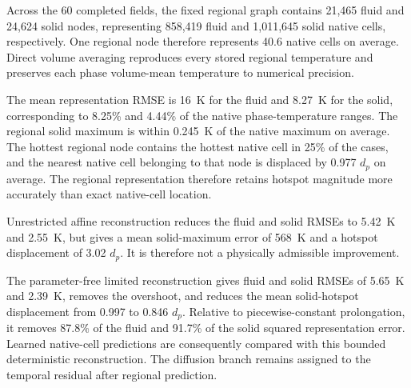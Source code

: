 Across the 60 completed fields, the fixed regional graph contains 21,465 fluid and 24,624 solid nodes, representing 858,419 fluid and 1,011,645 solid native cells, respectively. One regional node therefore represents 40.6 native cells on average. Direct volume averaging reproduces every stored regional temperature and preserves each phase volume-mean temperature to numerical precision.

The mean representation RMSE is \SI{16}{K} for the fluid and \SI{8.27}{K} for the solid, corresponding to 8.25\% and 4.44\% of the native phase-temperature ranges. The regional solid maximum is within \SI{0.245}{K} of the native maximum on average. The hottest regional node contains the hottest native cell in 25\% of the cases, and the nearest native cell belonging to that node is displaced by 0.977 $d_p$ on average. The regional representation therefore retains hotspot magnitude more accurately than exact native-cell location.

Unrestricted affine reconstruction reduces the fluid and solid RMSEs to \SI{5.42}{K} and \SI{2.55}{K}, but gives a mean solid-maximum error of \SI{568}{K} and a hotspot displacement of 3.02 $d_p$. It is therefore not a physically admissible improvement.

The parameter-free limited reconstruction gives fluid and solid RMSEs of \SI{5.65}{K} and \SI{2.39}{K}, removes the overshoot, and reduces the mean solid-hotspot displacement from 0.997 to 0.846 $d_p$. Relative to piecewise-constant prolongation, it removes 87.8\% of the fluid and 91.7\% of the solid squared representation error. Learned native-cell predictions are consequently compared with this bounded deterministic reconstruction. The diffusion branch remains assigned to the temporal residual after regional prediction.
